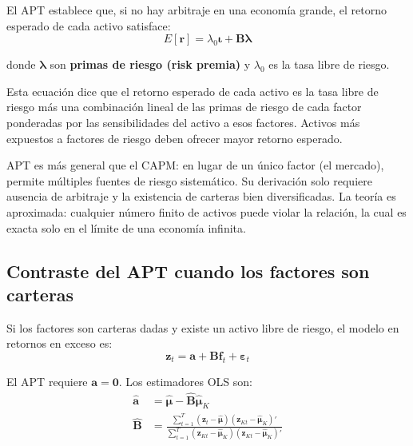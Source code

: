 \documentclass[12pt]{article}
\begin{document}
El APT establece que, si no hay arbitraje en una econom\'ia grande, el retorno esperado de cada activo satisface:
\begin{equation}
    E[\mathbf{r}] = \lambda_0 \boldsymbol{\iota} + \mathbf{B}\boldsymbol{\lambda}
\end{equation}

donde $\boldsymbol{\lambda}$ son \textbf{primas de riesgo (risk premia)} y $\lambda_0$ es la tasa libre de riesgo.

\begin{intuicionmat}
Esta ecuaci\'on dice que el retorno esperado de cada activo es la tasa libre de riesgo m\'as una combinaci\'on lineal de las primas de riesgo de cada factor ponderadas por las sensibilidades del activo a esos factores. Activos m\'as expuestos a factores de riesgo deben ofrecer mayor retorno esperado.
\end{intuicionmat}

\begin{intuicion}
APT es m\'as general que el CAPM: en lugar de un \'unico factor (el mercado), permite m\'ultiples fuentes de riesgo sistem\'atico. Su derivaci\'on solo requiere ausencia de arbitraje y la existencia de carteras bien diversificadas. La teor\'ia es aproximada: cualquier n\'umero finito de activos puede violar la relaci\'on, la cual es exacta solo en el l\'imite de una econom\'ia infinita.
\end{intuicion}

\subsection{Contraste del APT cuando los factores son carteras}

Si los factores son carteras dadas y existe un activo libre de riesgo, el modelo en retornos en exceso es:
\begin{equation}
    \mathbf{z}_t = \mathbf{a} + \mathbf{B}\mathbf{f}_t + \boldsymbol{\varepsilon}_t
\end{equation}

El APT requiere $\mathbf{a} = \mathbf{0}$. Los estimadores OLS son:
\begin{align}
    \hat{\mathbf{a}} &= \hat{\boldsymbol{\mu}} - \hat{\mathbf{B}}\hat{\boldsymbol{\mu}}_K \\
    \hat{\mathbf{B}} &= \frac{\sum_{t=1}^{T}(\mathbf{z}_t - \hat{\boldsymbol{\mu}})(\mathbf{z}_{Kt} - \hat{\boldsymbol{\mu}}_K)'}{\sum_{t=1}^{T}(\mathbf{z}_{Kt} - \hat{\boldsymbol{\mu}}_K)(\mathbf{z}_{Kt} - \hat{\boldsymbol{\mu}}_K)'}
\end{align}
\end{document}
